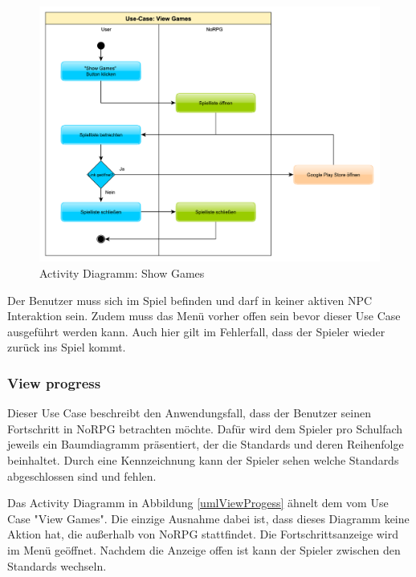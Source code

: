 			\begin{figure}[htbp]
				\centering 
				\label{umlShowGames}
				\includegraphics[width=12cm]{pics/ShowGames.pdf}
				\caption{Activity Diagramm: Show Games}
			\end{figure}

			Der Benutzer muss sich im Spiel befinden und darf in keiner aktiven NPC Interaktion sein. Zudem muss das Menü vorher offen sein bevor dieser Use Case ausgeführt werden kann. Auch hier gilt im Fehlerfall, dass der Spieler wieder zurück ins Spiel kommt.
	
		\subsubsection{View progress}
			Dieser Use Case beschreibt den Anwendungsfall, dass der Benutzer seinen Fortschritt in NoRPG betrachten möchte. Dafür wird dem Spieler pro Schulfach jeweils ein Baumdiagramm präsentiert, der die Standards und deren Reihenfolge beinhaltet. Durch eine Kennzeichnung kann der Spieler sehen welche Standards abgeschlossen sind und fehlen.  
			
			Das Activity Diagramm in Abbildung \ref{umlViewProgess} ähnelt dem vom Use Case "View Games". Die einzige Ausnahme dabei ist, dass dieses Diagramm keine Aktion hat, die außerhalb von NoRPG stattfindet. Die Fortschrittsanzeige wird im Menü geöffnet. Nachdem die Anzeige offen ist kann der Spieler zwischen den Standards wechseln.
			
